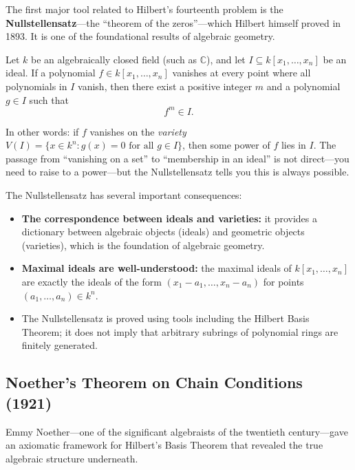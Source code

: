 The first major tool related to Hilbert's fourteenth problem is the \textbf{Nullstellensatz}---the ``theorem of the zeros''---which Hilbert himself proved in 1893. It is one of the foundational results of algebraic geometry.

\begin{theorem}\label{thm:nullstellensatz}
Let $k$ be an algebraically closed field (such as $\mathbb{C}$), and let $I \subseteq k[x_1, \ldots, x_n]$ be an ideal. If a polynomial $f \in k[x_1, \ldots, x_n]$ vanishes at every point where all polynomials in $I$ vanish, then there exist a positive integer $m$ and a polynomial $g \in I$ such that
\[
    f^m \in I.
\]
\end{theorem}

In other words: if $f$ vanishes on the \emph{variety} $V(I) = \{x \in k^n : g(x) = 0 \text{ for all } g \in I\}$, then some power of $f$ lies in $I$. The passage from ``vanishing on a set'' to ``membership in an ideal'' is not direct---you need to raise to a power---but the Nullstellensatz tells you this is always possible.

The Nullstellensatz has several important consequences:

\begin{itemize}
    \item \textbf{The correspondence between ideals and varieties:} it provides a dictionary between algebraic objects (ideals) and geometric objects (varieties), which is the foundation of algebraic geometry.
    \item \textbf{Maximal ideals are well-understood:} the maximal ideals of $k[x_1, \ldots, x_n]$ are exactly the ideals of the form $(x_1 - a_1, \ldots, x_n - a_n)$ for points $(a_1, \ldots, a_n) \in k^n$.
    \item The Nullstellensatz is proved using tools including the Hilbert Basis Theorem; it does not imply that arbitrary subrings of polynomial rings are finitely generated.
\end{itemize}

\subsection{Noether's Theorem on Chain Conditions (1921)}

Emmy Noether---one of the significant algebraists of the twentieth century---gave an axiomatic framework for Hilbert's Basis Theorem that revealed the true algebraic structure underneath.

